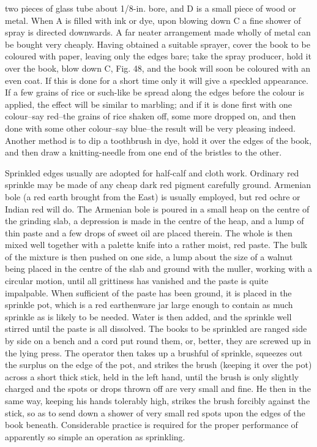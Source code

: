\documentclass[twoside]{book}
\begin{document}
two pieces of glass tube about 1/8-in. bore, and
D is a small piece of wood or metal. When A is
filled with ink or dye, upon blowing down C a fine
shower of spray is directed downwards. A far
neater arrangement made wholly of metal can
be bought very cheaply. Having obtained a
suitable sprayer, cover the book to be coloured
with paper, leaving only the edges bare;
take the spray producer, hold it over the book,
blow down C, Fig. 48, and the book will soon be
coloured with an even coat. If this is done for a
short time only it will give a speckled appearance.
\pagebreak
If a few grains of rice or such-like be spread along
the edges before the colour is applied, the effect
will be similar to marbling; and if it is done first
with one colour--say red--the grains of rice shaken
off, some more dropped on, and then done with
some other colour--say blue--the result will be very
pleasing indeed. Another method is to dip a
toothbrush in dye, hold it over the edges of the book,
and then draw a knitting-needle from one end of
the bristles to the other.

Sprinkled edges usually are adopted for half-calf
and cloth work. Ordinary red sprinkle may be
made of any cheap dark red pigment carefully
ground. Armenian bole (a red earth brought from
the East) is usually employed, but red ochre or
Indian red will do. The Armenian bole is poured
in a small heap on the centre of the grinding slab,
a depression is made in the centre of the heap,
and a lump of thin paste and a few drops of sweet
oil are placed therein. The whole is then mixed
well together with a palette knife into a rather
moist, red paste. The bulk of the mixture is then
pushed on one side, a lump about the size of a
walnut being placed in the centre of the slab and
ground with the muller, working with a circular
motion, until all grittiness has vanished and the
paste is quite impalpable. When sufficient of the
paste has been ground, it is placed in the sprinkle
pot, which is a red earthenware jar large enough
to contain as much sprinkle as is likely to be
needed. Water is then added, and the sprinkle
well stirred until the paste is all dissolved. The
books to be sprinkled are ranged side by side on a
bench and a cord put round them, or, better, they
are screwed up in the lying press. The operator
then takes up a brushful of sprinkle, squeezes out
the surplus on the edge of the pot, and strikes the
brush (keeping it over the pot) across a short thick
stick, held in the left hand, until the brush is only
\pagebreak
slightly charged and the spots or drops thrown off
are very small and fine. He then in the same way,
keeping his hands tolerably high, strikes the brush
forcibly against the stick, so as to send down a
shower of very small red spots upon the edges of
the book beneath. Considerable practice is required
for the proper performance of apparently so simple
an operation as sprinkling.
\end{document}
